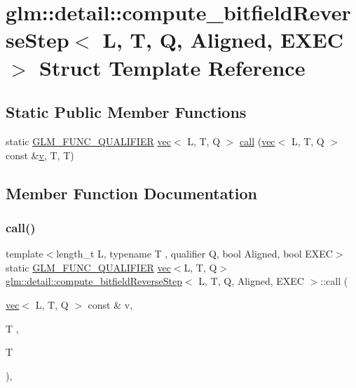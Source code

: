 \hypertarget{structglm_1_1detail_1_1compute__bitfield_reverse_step}{}\section{glm\+:\+:detail\+:\+:compute\+\_\+bitfield\+Reverse\+Step$<$ L, T, Q, Aligned, E\+X\+EC $>$ Struct Template Reference}
\label{structglm_1_1detail_1_1compute__bitfield_reverse_step}
\subsection*{Static Public Member Functions}
\begin{DoxyCompactItemize}
\item 
static \mbox{\hyperlink{setup_8hpp_a33fdea6f91c5f834105f7415e2a64407}{G\+L\+M\+\_\+\+F\+U\+N\+C\+\_\+\+Q\+U\+A\+L\+I\+F\+I\+ER}} \mbox{\hyperlink{structglm_1_1vec}{vec}}$<$ L, T, Q $>$ \mbox{\hyperlink{structglm_1_1detail_1_1compute__bitfield_reverse_step_aa09f49bf6a1f36a957a628cc01812882}{call}} (\mbox{\hyperlink{structglm_1_1vec}{vec}}$<$ L, T, Q $>$ const \&\mbox{\hyperlink{_s_d_l__opengl_8h_a10a82eabcb59d2fcd74acee063775f90}{v}}, T, T)
\end{DoxyCompactItemize}


\subsection{Member Function Documentation}
\mbox{\label{structglm_1_1detail_1_1compute__bitfield_reverse_step_aa09f49bf6a1f36a957a628cc01812882}} 
\subsubsection{\texorpdfstring{call()}{call()}}
{\footnotesize\ttfamily template$<$length\+\_\+t L, typename T , qualifier Q, bool Aligned, bool E\+X\+EC$>$ \\
static \mbox{\hyperlink{setup_8hpp_a33fdea6f91c5f834105f7415e2a64407}{G\+L\+M\+\_\+\+F\+U\+N\+C\+\_\+\+Q\+U\+A\+L\+I\+F\+I\+ER}} \mbox{\hyperlink{structglm_1_1vec}{vec}}$<$L, T, Q$>$ \mbox{\hyperlink{structglm_1_1detail_1_1compute__bitfield_reverse_step}{glm\+::detail\+::compute\+\_\+bitfield\+Reverse\+Step}}$<$ L, T, Q, Aligned, E\+X\+EC $>$\+::call (\begin{DoxyParamCaption}\item[{\mbox{\hyperlink{structglm_1_1vec}{vec}}$<$ L, T, Q $>$ const \&}]{v,  }\item[{T}]{,  }\item[{T}]{ }\end{DoxyParamCaption})\hspace{0.3cm}{\ttfamily [inline]}, {\ttfamily [static]}}



